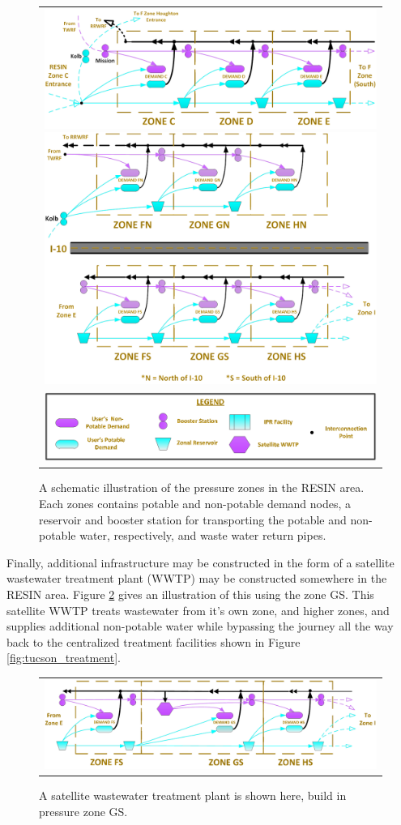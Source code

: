 \documentclass[opre,nonblindrev]{informs3} %
\begin{document}
\begin{figure}
	\FIGURE
	{%
		\begin{tabular}{c}
			\includegraphics*[width=.5\textwidth]{tucson_water_images/zones_c_e.png}%
			\includegraphics*[width=.5\textwidth]{tucson_water_images/zones_split.png} \\
			\includegraphics*[width=.6\textwidth]{tucson_water_images/zones_legend.png}
		\end{tabular}
	}
	{
		A schematic illustration of the pressure zones in the RESIN area.
		Each zones contains potable and non-potable demand nodes, a reservoir and booster station for transporting the potable and non-potable water, respectively, and waste water return pipes.
		\label{fig:tucson_zones}
	}
	{}
\end{figure}

Finally, additional infrastructure may be constructed in the form of a satellite wastewater treatment plant (WWTP) may be constructed somewhere in the RESIN area.
Figure \ref{fig:tucson_zones_wwtp} gives an illustration of this using the zone GS.
This satellite WWTP treats wastewater from it's own zone, and higher zones, and supplies additional non-potable water while bypassing the journey all the way back to the centralized treatment facilities shown in Figure \ref{fig:tucson_treatment}.

\begin{figure}
	\FIGURE
	{%
		\begin{tabular}{c}
			\includegraphics*[width=.8\textwidth]{tucson_water_images/zones_south.png}%
		\end{tabular}
	}
	{
		A satellite wastewater treatment plant is shown here, build in pressure zone GS.
		\label{fig:tucson_zones_wwtp}
	}
	{}
\end{figure}
\end{document}

